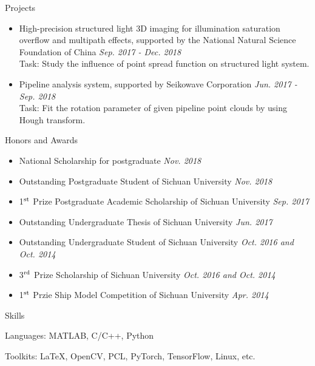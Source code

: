 \documentclass{resume} %
\begin{document}
\begin{rSection}{Projects}
\begin{itemize}[leftmargin=*]
		\item  High-precision structured light 3D imaging for illumination saturation overflow and multipath effects, supported by the National Natural Science Foundation of China 
		\hfill {\em Sep. 2017 - Dec. 2018}\vspace{1.5mm}\\		
		Task: Study the influence of point spread function on structured light system.
		
		\item  Pipeline analysis system, supported by Seikowave Corporation 
		\hfill {\em Jun. 2017 - Sep. 2018}\vspace{1.5mm}\\		
		Task: Fit the rotation parameter of given pipeline point clouds by using Hough transform.
							
	\end{itemize}
\end{rSection}

\begin{rSection}{Honors and Awards}
	\begin{itemize}[leftmargin=*]
		\item National Scholarship for postgraduate \hfill {\em Nov. 2018}
		\item Outstanding Postgraduate Student of Sichuan University \hfill {\em Nov. 2018} 
		\item {1$^{\rm st}$} Prize Postgraduate Academic Scholarship of Sichuan University \hfill {\em Sep. 2017}
		\item Outstanding Undergraduate Thesis of Sichuan University \hfill {\em Jun. 2017}
		\item Outstanding Undergraduate Student of Sichuan University \hfill {\em Oct. 2016 and Oct. 2014} 
		\item {3$^{\rm rd}$} Prize Scholarship of Sichuan University \hfill {\em Oct. 2016 and Oct. 2014}
		\item {1$^{\rm st}$} Przie Ship Model Competition of Sichuan University \hfill {\em Apr. 2014}
	\end{itemize}
	
\end{rSection}

\begin{rSection}{Skills}
	\item Languages: MATLAB, C/C++, Python
	\item Toolkits: \LaTeX, OpenCV, PCL, PyTorch, TensorFlow, Linux, etc.
\end{rSection}
\end{document}
